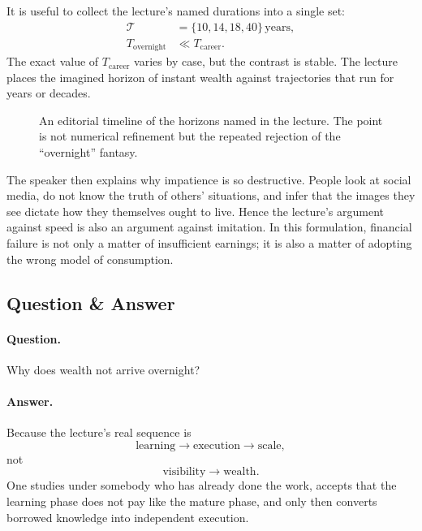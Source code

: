 It is useful to collect the lecture's named durations into a single set:
\begin{align}
\mathcal{T} &= \{10,14,18,40\}\,\text{years},\\
T_{\mathrm{overnight}} &\ll T_{\mathrm{career}}.
\end{align}
The exact value of \(T_{\mathrm{career}}\) varies by case, but the contrast is stable. The lecture places the imagined horizon of instant wealth against trajectories that run for years or decades.

\begin{figure}[h]
\centering
{}
\caption{An editorial timeline of the horizons named in the lecture. The point is not numerical refinement but the repeated rejection of the ``overnight'' fantasy.}
\end{figure}

The speaker then explains why impatience is so destructive. People look at social media, do not know the truth of others' situations, and infer that the images they see dictate how they themselves ought to live. Hence the lecture's argument against speed is also an argument against imitation. In this formulation, financial failure is not only a matter of insufficient earnings; it is also a matter of adopting the wrong model of consumption.

\subsection{Question \& Answer}

\paragraph{Question.}
Why does wealth not arrive overnight?

\paragraph{Answer.}
Because the lecture's real sequence is
\begin{equation}
\text{learning} \longrightarrow \text{execution} \longrightarrow \text{scale},
\end{equation}
not
\begin{equation}
\text{visibility} \longrightarrow \text{wealth}.
\end{equation}
One studies under somebody who has already done the work, accepts that the learning phase does not pay like the mature phase, and only then converts borrowed knowledge into independent execution.

